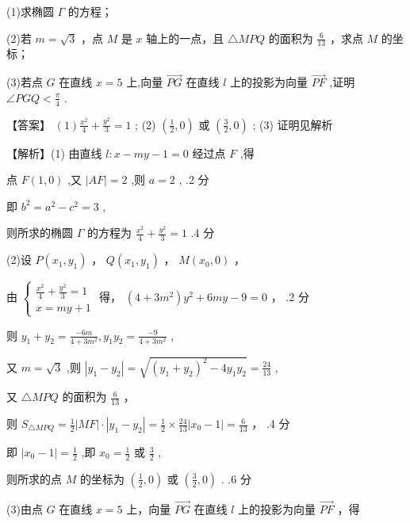 \documentclass[10pt]{article}
\begin{document}
(1)求椭圆 \(\Gamma\) 的方程；

(2)若 \(m = \sqrt{3}\) ，点 \(M\) 是 \(x\) 轴上的一点，且 \(\bigtriangleup  {MPQ}\) 的面积为 \(\frac{6}{13}\) ，求点 \(M\) 的坐标；

(3)若点 \(G\) 在直线 \(x = 5\) 上,向量 \(\overrightarrow{PG}\) 在直线 \(l\) 上的投影为向量 \(\overrightarrow{PF}\) ,证明 \(\angle {PGQ} < \frac{\pi }{4}\) .

【答案】 \(\left( 1\right) \frac{{x}^{2}}{4} + \frac{{y}^{2}}{3} = 1\) ; (2) \(\left( {\frac{1}{2},0}\right)\) 或 \(\left( {\frac{3}{2},0}\right)\) ; (3) 证明见解析

【解析】(1) 由直线 \(l : x - {my} - 1 = 0\) 经过点 \(F\) ,得

点 \(F\left( {1,0}\right)\) ,又 \(\left| {AF}\right|  = 2\) ,则 \(a = 2\) , .2 分

即 \({b}^{2} = {a}^{2} - {c}^{2} = 3\) ,

则所求的椭圆 \(\Gamma\) 的方程为 \(\frac{{x}^{2}}{4} + \frac{{y}^{2}}{3} = 1\) .4 分

(2)设 \(P\left( {{x}_{1},{y}_{1}}\right)\) ， \(Q\left( {{x}_{1},{y}_{1}}\right)\) ， \(M\left( {{x}_{0},0}\right)\) ，

由 \(\left\{  \begin{array}{l} \frac{{x}^{2}}{4} + \frac{{y}^{2}}{3} = 1 \\  x = {my} + 1 \end{array}\right.\) 得， \(\left( {4 + 3{m}^{2}}\right) {y}^{2} + {6my} - 9 = 0\) ， .2 分

则 \({y}_{1} + {y}_{2} = \frac{-{6m}}{4 + 3{m}^{2}},{y}_{1}{y}_{2} = \frac{-9}{4 + 3{m}^{2}}\) ,

又 \(m = \sqrt{3}\) ,则 \(\left| {{y}_{1} - {y}_{2}}\right|  = \sqrt{{\left( {y}_{1} + {y}_{2}\right) }^{2} - 4{y}_{1}{y}_{2}} = \frac{24}{13}\) ,

又 \(\bigtriangleup  {MPQ}\) 的面积为 \(\frac{6}{13}\) ，

则 \({S}_{\bigtriangleup {MPQ}} = \frac{1}{2}\left| {MF}\right|  \cdot  \left| {{y}_{1} - {y}_{2}}\right|  = \frac{1}{2} \times  \frac{24}{13}\left| {{x}_{0} - 1}\right|  = \frac{6}{13}\) ， .4 分

即 \(\left| {{x}_{0} - 1}\right|  = \frac{1}{2}\) ,即 \({x}_{0} = \frac{1}{2}\) 或 \(\frac{3}{2}\) ,

则所求的点 \(M\) 的坐标为 \(\left( {\frac{1}{2},0}\right)\) 或 \(\left( {\frac{3}{2},0}\right)\) . .6 分

(3)由点 \(G\) 在直线 \(x = 5\) 上，向量 \(\overrightarrow{PG}\) 在直线 \(l\) 上的投影为向量 \(\overrightarrow{PF}\) ，得
\end{document}
